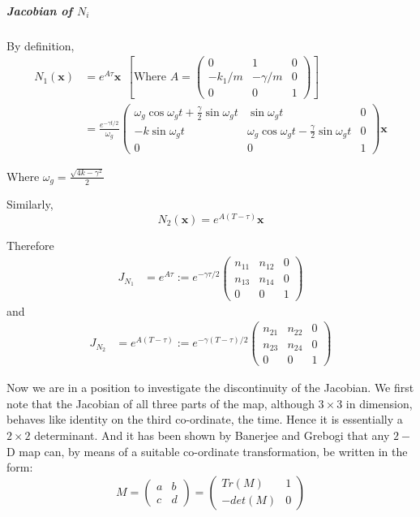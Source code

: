 \documentclass{book}
\renewcommand{\(}{\begin{columns}}
\renewcommand{\)}{\end{columns}}
\newcommand{\<}[1]{\begin{column}{#1}}
\renewcommand{\>}{\end{column}}
\newcommand{\bb}[1]{\textbf{#1}}
\newcommand{\mb}[1]{\mathbf{#1}}
\newcommand{\subpara}{\subparagraph}
\begin{document}
\subpara{Jacobian of  $N_i$\\}

By definition,
\begin{align}
\label{eq-Nmatrix}
N_1(\bb{x})&=e^{A\tau}\bb{x}~~\left[\text{Where }A=
\begin{pmatrix}
0 & 1 & 0\\
-k_1/m & -\gamma/m & 0\\
0 & 0 & 1
\end{pmatrix}\right]
\\
&=\frac{e^{-\gamma t/2}}{\omega_g}
\begin{pmatrix}
\omega_g\cos{\omega_g t}+\frac{\gamma}{2}\sin{\omega_g t} & \sin{\omega_g t} & 0\\
-k\sin{\omega_g t} & \omega_g\cos{\omega_g t}-\frac{\gamma}{2}\sin{\omega_g t} 
& 0\\
0 & 0 & 1
\end{pmatrix}\bb{x}
\end{align}

Where $\omega_g=\frac{\sqrt{4k-\gamma^2}}{2}$



Similarly,
\[
N_2(\mb{x})=e^{A(T-\tau)}\mb{x}
\]

Therefore 
\begin{align}
\label{eq-n1-jacob}
J_{N_1}&=e^{A\tau}
:=e^{-\gamma\tau/2}
\begin{pmatrix}
n_{11} & n_{12} & 0\\
n_{13} & n_{14} & 0\\
0 & 0 & 1
\end{pmatrix}
\end{align}
and
\begin{align}
\label{eq-n2-jacob}
J_{N_2}&=e^{A(T-\tau)}
:=e^{-\gamma(T-\tau)/2}
\begin{pmatrix}
n_{21} & n_{22} & 0\\
n_{23} & n_{24} & 0\\
0 & 0 & 1
\end{pmatrix}
\end{align}


Now we are in a position to investigate the discontinuity of the Jacobian.  We 
first note that the Jacobian of all three parts of the map, although 
$3\times 3$ in dimension, behaves like identity on the third co-ordinate, the 
time.  Hence it is essentially a $2\times 2$ determinant.  And it has been 
shown by Banerjee and Grebogi that any $2-$D map can, by means of a suitable 
co-ordinate transformation, be written in the form:
\[
M=
\begin{pmatrix}
a & b\\
c & d
\end{pmatrix}
=
\begin{pmatrix}
Tr(M) & 1\\
-det(M) & 0
\end{pmatrix}
\]
\end{document}
